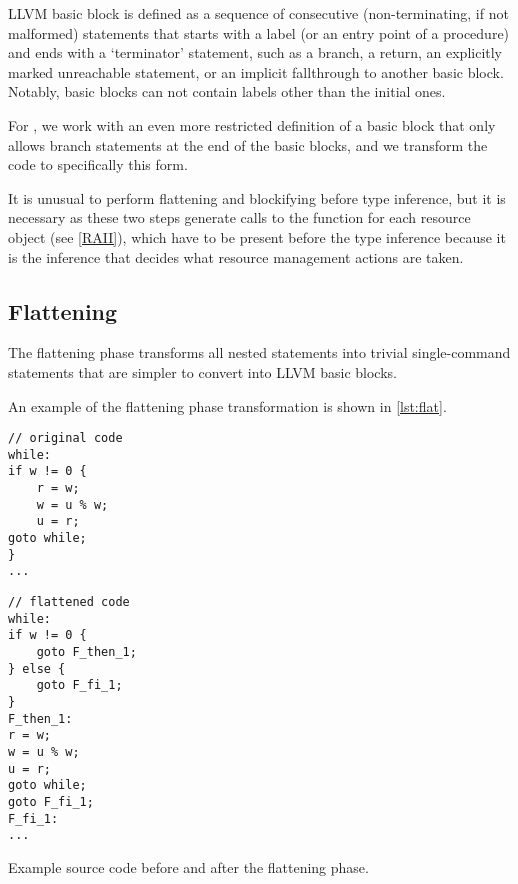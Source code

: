 LLVM basic block is defined as a sequence of consecutive (non-terminating, if not malformed) statements that starts with a label (or an entry point of a procedure) and ends with a `terminator' statement, such as a branch, a return, an explicitly marked unreachable statement, or an implicit fallthrough to another basic block. Notably, basic blocks can not contain labels other than the initial ones.

For \cmm, we work with an even more restricted definition of a basic block that only allows branch statements at the end of the basic blocks, and we transform the code to specifically this form.

It is unusual to perform flattening and blockifying before type inference, but it is necessary as these two steps generate calls to the  function for each resource object (see \cref{RAII}), which have to be present before the type inference because it is the inference that decides what resource management actions are taken.

\subsection{Flattening}

The flattening phase transforms all nested statements into trivial single-command statements that are simpler to convert into LLVM basic blocks.

An example of the flattening phase transformation is shown in \cref{lst:flat}.

\begin{codex}
\begin{center}
\begin{minipage}{0.5\linewidth}
\begin{lstlisting}
// original code
while:
if w != 0 {
    r = w;
    w = u % w;
    u = r;
goto while;
}
...\end{lstlisting}
\end{minipage}%
\begin{minipage}{0.5\linewidth}
\begin{lstlisting}
// flattened code
while:
if w != 0 {
    goto F_then_1;
} else {
    goto F_fi_1;
}
F_then_1:
r = w;
w = u % w;
u = r;
goto while;
goto F_fi_1;
F_fi_1:
...\end{lstlisting}
\end{minipage}
\end{center}
\caption{Example source code before and after the flattening phase.}
\label{lst:flat}
\end{codex}

